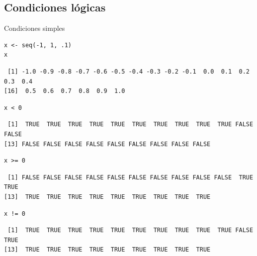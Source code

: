 \documentclass[xcolor={usenames,svgnames,dvipsnames}]{beamer}
\begin{document}
\subsection{Condiciones lógicas}
\label{sec-3-1}
\begin{frame}[fragile,label=sec-3-1-1]{Condiciones simples}
 \lstset{language=R,label= ,caption= ,numbers=none}
\begin{lstlisting}
x <- seq(-1, 1, .1)
x
\end{lstlisting}

\begin{verbatim}
 [1] -1.0 -0.9 -0.8 -0.7 -0.6 -0.5 -0.4 -0.3 -0.2 -0.1  0.0  0.1  0.2  0.3  0.4
[16]  0.5  0.6  0.7  0.8  0.9  1.0
\end{verbatim}

\lstset{language=R,label= ,caption= ,numbers=none}
\begin{lstlisting}
x < 0
\end{lstlisting}

\begin{verbatim}
 [1]  TRUE  TRUE  TRUE  TRUE  TRUE  TRUE  TRUE  TRUE  TRUE  TRUE FALSE FALSE
[13] FALSE FALSE FALSE FALSE FALSE FALSE FALSE FALSE FALSE
\end{verbatim}

\lstset{language=R,label= ,caption= ,numbers=none}
\begin{lstlisting}
x >= 0
\end{lstlisting}

\begin{verbatim}
 [1] FALSE FALSE FALSE FALSE FALSE FALSE FALSE FALSE FALSE FALSE  TRUE  TRUE
[13]  TRUE  TRUE  TRUE  TRUE  TRUE  TRUE  TRUE  TRUE  TRUE
\end{verbatim}

\lstset{language=R,label= ,caption= ,numbers=none}
\begin{lstlisting}
x != 0
\end{lstlisting}

\begin{verbatim}
 [1]  TRUE  TRUE  TRUE  TRUE  TRUE  TRUE  TRUE  TRUE  TRUE  TRUE FALSE  TRUE
[13]  TRUE  TRUE  TRUE  TRUE  TRUE  TRUE  TRUE  TRUE  TRUE
\end{verbatim}
\end{frame}
\end{document}

